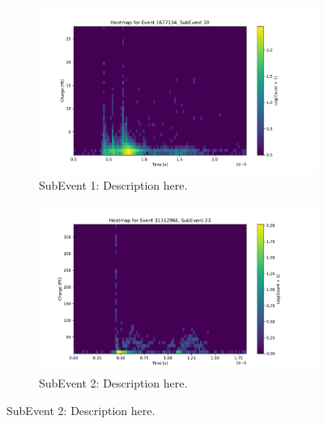 \begin{figure}[h!]
    \centering
    \begin{subfigure}[t]{0.49\textwidth}
        \centering
        \includegraphics[width=\textwidth]{Plots/heatmap_subevent_triple_high.pdf}
        \caption{SubEvent 1: Description here.}
        \label{fig:subevent1}
    \end{subfigure}
    \hfill
    \begin{subfigure}[t]{0.49\textwidth}
        \centering
        \includegraphics[width=\textwidth]{Plots/heatmap_subevent_double_high.pdf}
        \caption{SubEvent 2: Description here.}
        \label{fig:subevent2}
    \end{subfigure}
    

\end{figure}
